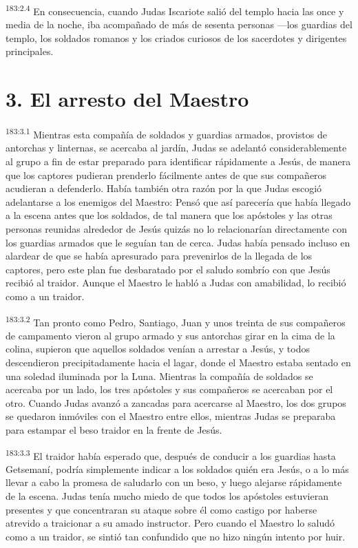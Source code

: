 \par 
\textsuperscript{183:2.4} En consecuencia, cuando Judas Iscariote salió del templo hacia las once y media de la noche, iba acompañado de más de sesenta personas ---los guardias del templo, los soldados romanos y los criados curiosos de los sacerdotes y dirigentes principales.

\section*{3. El arresto del Maestro}
\par 
\textsuperscript{183:3.1} Mientras esta compañía de soldados y guardias armados, provistos de antorchas y linternas, se acercaba al jardín, Judas se adelantó considerablemente al grupo a fin de estar preparado para identificar rápidamente a Jesús, de manera que los captores pudieran prenderlo fácilmente antes de que sus compañeros acudieran a defenderlo. Había también otra razón por la que Judas escogió adelantarse a los enemigos del Maestro: Pensó que así parecería que había llegado a la escena antes que los soldados, de tal manera que los apóstoles y las otras personas reunidas alrededor de Jesús quizás no lo relacionarían directamente con los guardias armados que le seguían tan de cerca. Judas había pensado incluso en alardear de que se había apresurado para prevenirlos de la llegada de los captores, pero este plan fue desbaratado por el saludo sombrío con que Jesús recibió al traidor. Aunque el Maestro le habló a Judas con amabilidad, lo recibió como a un traidor.

\par 
\textsuperscript{183:3.2} Tan pronto como Pedro, Santiago, Juan y unos treinta de sus compañeros de campamento vieron al grupo armado y sus antorchas girar en la cima de la colina, supieron que aquellos soldados venían a arrestar a Jesús, y todos descendieron precipitadamente hacia el lagar, donde el Maestro estaba sentado en una soledad iluminada por la Luna. Mientras la compañía de soldados se acercaba por un lado, los tres apóstoles y sus compañeros se acercaban por el otro. Cuando Judas avanzó a zancadas para acercarse al Maestro, los dos grupos se quedaron inmóviles con el Maestro entre ellos, mientras Judas se preparaba para estampar el beso traidor en la frente de Jesús.

\par 
\textsuperscript{183:3.3} El traidor había esperado que, después de conducir a los guardias hasta Getsemaní, podría simplemente indicar a los soldados quién era Jesús, o a lo más llevar a cabo la promesa de saludarlo con un beso, y luego alejarse rápidamente de la escena. Judas tenía mucho miedo de que todos los apóstoles estuvieran presentes y que concentraran su ataque sobre él como castigo por haberse atrevido a traicionar a su amado instructor. Pero cuando el Maestro lo saludó como a un traidor, se sintió tan confundido que no hizo ningún intento por huir.

